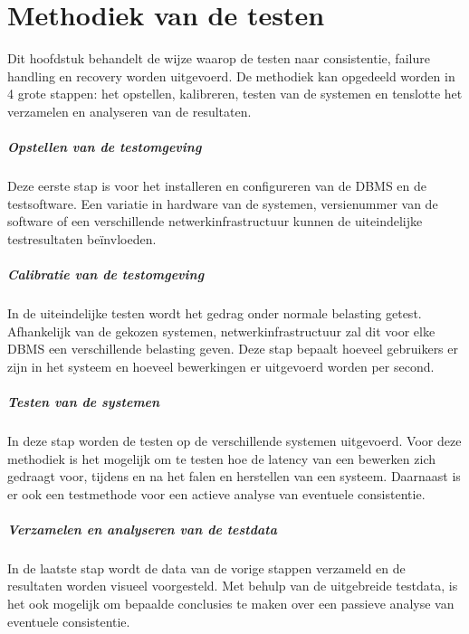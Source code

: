 \chapter{Methodiek van de testen}	
Dit hoofdstuk behandelt de wijze waarop de testen naar consistentie, failure handling en recovery worden uitgevoerd. 
De methodiek kan opgedeeld worden in 4 grote stappen: het opstellen, kalibreren, testen van de systemen en tenslotte het verzamelen en analyseren van de resultaten.

\paragraph{Opstellen van de testomgeving} Deze eerste stap is voor het installeren en configureren van de DBMS en de testsoftware. Een variatie in hardware van de systemen, versienummer van de software of een verschillende netwerkinfrastructuur kunnen de uiteindelijke testresultaten beïnvloeden. 

\paragraph{Calibratie van de testomgeving} In de uiteindelijke testen wordt het gedrag onder normale belasting getest. Afhankelijk van de gekozen systemen, netwerkinfrastructuur zal dit voor elke DBMS een verschillende belasting geven. Deze stap bepaalt hoeveel gebruikers er zijn in het systeem en hoeveel bewerkingen er uitgevoerd worden per second. 

\paragraph{Testen van de systemen} In deze stap worden de testen op de verschillende systemen uitgevoerd. Voor deze methodiek is het mogelijk om te testen hoe de latency van een bewerken zich gedraagt voor, tijdens en na het falen en herstellen van een systeem.  Daarnaast is er ook een testmethode voor een actieve analyse van eventuele consistentie. 

\paragraph{Verzamelen en analyseren van de testdata} In de laatste stap wordt de data van de vorige stappen verzameld en de resultaten worden visueel voorgesteld. Met behulp van de uitgebreide testdata, is het ook mogelijk om bepaalde conclusies te maken over een passieve analyse van eventuele consistentie. 

